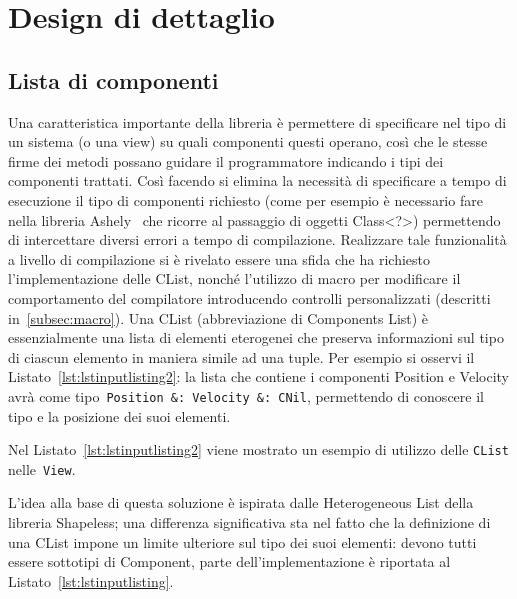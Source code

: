 \chapter{Design di dettaglio}\label{ch:design-di-dettaglio}

\section{Lista di componenti}\label{sec:lista-di-componenti}
Una caratteristica importante della libreria è permettere di specificare nel tipo di un sistema (o una view)
su quali componenti questi operano, così che le stesse firme dei metodi possano guidare il programmatore indicando i
tipi dei componenti trattati.
Così facendo si elimina la necessità di specificare a tempo di esecuzione il tipo di componenti richiesto (come per
esempio è necessario fare nella libreria Ashely~\cite{ashley} che ricorre al passaggio di oggetti Class<?>)
permettendo di intercettare diversi errori a tempo di compilazione.
Realizzare tale funzionalità a livello di compilazione si è rivelato essere una sfida che ha richiesto l’implementazione
delle CList, nonché l’utilizzo di macro per modificare il comportamento del compilatore introducendo controlli
personalizzati (descritti in~\ref{subsec:macro}).
Una CList (abbreviazione di Components List) è essenzialmente una lista di elementi eterogenei che preserva informazioni
sul tipo di ciascun elemento in maniera simile ad una tuple.
Per esempio si osservi il Listato~\ref{lst:lstinputlisting2}: la lista che contiene
i componenti Position e Velocity avrà come tipo~\texttt{Position~\&:~Velocity~\&:~CNil}, permettendo di conoscere il
tipo e la posizione dei suoi elementi.

Nel Listato~\ref{lst:lstinputlisting2} viene mostrato un esempio di utilizzo delle \texttt{CList} nelle~\texttt{View}.


L’idea alla base di questa soluzione è ispirata dalle Heterogeneous List della libreria
Shapeless\cite{shapeless}; una differenza significativa sta nel fatto che la definizione di una CList impone un
limite ulteriore sul tipo dei suoi elementi: devono tutti essere sottotipi di Component, parte dell’implementazione è
riportata al Listato~\ref{lst:lstinputlisting}.




